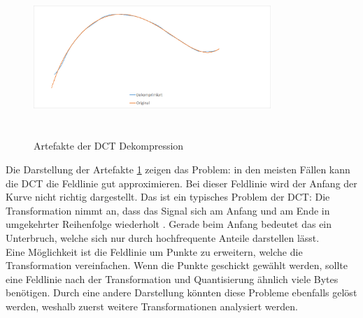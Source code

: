 \begin{figure}[!htbp]
	\center
	\includegraphics[width=0.8\textwidth,height=6cm,keepaspectratio]{./pictures/resultate/loesung1/loesung1-0/loesung1_0_artefakte.png}
	\caption{Artefakte der DCT Dekompression}
	\label{resultate:loesung1:dct:artefakte}
\end{figure}
Die Darstellung der Artefakte \ref{resultate:loesung1:dct:artefakte} zeigen das Problem: in den meisten Fällen kann die DCT die Feldlinie gut approximieren. Bei dieser Feldlinie wird der Anfang der Kurve nicht richtig dargestellt. Das ist ein typisches Problem der DCT: Die Transformation nimmt an, dass das Signal sich am Anfang und am Ende in umgekehrter Reihenfolge wiederholt \cite{wiki:dct}. Gerade beim Anfang bedeutet das ein Unterbruch, welche sich nur durch hochfrequente Anteile darstellen lässt.\\
Eine Möglichkeit ist die Feldlinie um Punkte zu erweitern, welche die Transformation vereinfachen. Wenn die Punkte geschickt gewählt werden, sollte eine Feldlinie nach der Transformation und Quantisierung ähnlich viele Bytes benötigen. Durch eine andere Darstellung könnten diese Probleme ebenfalls gelöst werden, weshalb zuerst weitere Transformationen analysiert werden.

